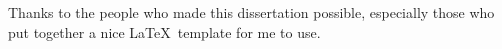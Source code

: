 Thanks to the people who made this dissertation possible, especially those who put together a nice \LaTeX\, template for me to use.